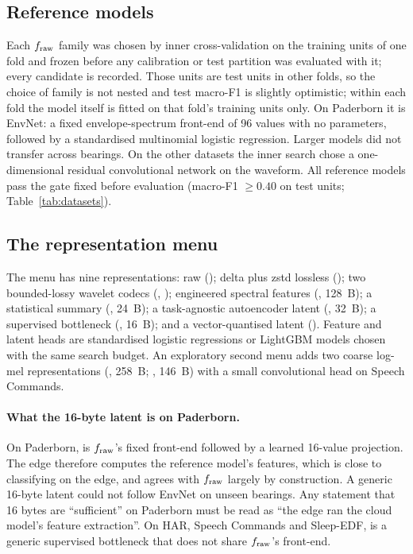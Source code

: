 \subsection{Reference models}

Each $f_{\mathrm{raw}}$ family was chosen by inner cross-validation on the training units of one fold and
frozen before any calibration or test partition was evaluated with it; every candidate is recorded.
Those units are test units in other folds, so the choice of family is not nested and test macro-F1
is slightly optimistic; within each fold the model itself is fitted on that fold's training units
only. On Paderborn it
is EnvNet: a fixed envelope-spectrum front-end of 96 values with no parameters, followed by a
standardised multinomial logistic regression. Larger models did not transfer across bearings. On
the other datasets the inner search chose a one-dimensional residual convolutional network on the
waveform. All reference models pass the gate fixed before evaluation (macro-F1 $\ge 0.40$ on test
units; Table~\ref{tab:datasets}).

\subsection{The representation menu}

The menu has nine representations: raw (); delta plus zstd lossless (); two
bounded-lossy wavelet codecs (, ); engineered spectral features (,
128~B); a statistical summary (, 24~B); a task-agnostic autoencoder latent (,
32~B); a supervised bottleneck (, 16~B); and a vector-quantised latent (). Feature
and latent heads are standardised logistic regressions or LightGBM models chosen with the same
search budget. An exploratory second menu adds two coarse log-mel representations (,
258~B; , 146~B) with a small convolutional head on Speech Commands\expl.

\paragraph{What the 16-byte latent is on Paderborn.} On Paderborn,  is $f_{\mathrm{raw}}$'s fixed
front-end followed by a learned 16-value projection. The edge therefore computes the reference
model's features, which is close to classifying on the edge, and  agrees with $f_{\mathrm{raw}}$
largely by construction. A generic 16-byte latent could not follow EnvNet on unseen bearings. Any
statement that 16 bytes are ``sufficient'' on Paderborn must be read as ``the edge ran the cloud
model's feature extraction''. On HAR, Speech Commands and Sleep-EDF,  is a generic
supervised bottleneck that does not share $f_{\mathrm{raw}}$'s front-end.


